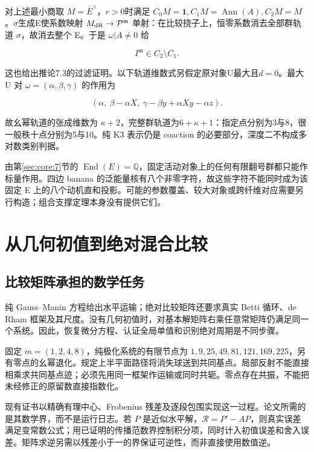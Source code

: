 \documentclass[11pt,a4paper,oneside]{ctexrep}
\theoremstyle{cnplain}
\theoremstyle{definition}
\theoremstyle{remark}
\begin{document}
对上述最小商取 \(M=\bar E^\vee\)，\(r>0\)时满足 \(C_0M=\mathbf1,C_1M=\operatorname{Ann}(A),C_2M=M\)。\(\sigma \)生成E使系数映射 \(M_{\rm dR}\to\mathcal P^{\mathfrak m}\) 单射：在比较挠子上，恒零系数消去全部群轨道 \(\sigma \)，故消去整个 E。于是 \(\omega|A\ne0\) 给

\begin{equation}
I^{\mathfrak m}\in C_2\setminus C_1. 
                                                               \label{eq:coaction:9.4}
\end{equation}

这也给出推论7.3的过滤证明。以下轨道维数式另假定原对象U最大且\(d=0\)。最大 U 对 \(\omega=(\alpha,\beta,\gamma)\) 的作用为

\begin{equation}
(\alpha,\ \beta-\alpha X,\ \gamma-\beta y+\alpha Xy-\alpha z).
\end{equation}

故幺幂轨道的张成维数为 \(\kappa +2\)，完整群轨道为\(6+\kappa +1\)：指定点分别为3与8，很一般秩十点分别为5与10。纯 K3 表示仍是 coaction 的必要部分，深度二不构成多对数类别判据。

由第\ref{sec:core:7}节的 \(\operatorname{End}(E)=\mathbb Q\)，固定活动对象上的任何有限翻号群都只能作标量作用。四边 banana 的泛能量核有八个非零字符，故这些字符不能同时成为该固定 E 上的八个动机直和投影。可能的参数覆盖、较大对象或跨纤维对应需要另行构造；组合支撑定理本身没有提供它们。


\chapter{从几何初值到绝对混合比较}\label{ch:comparison}
\section{比较矩阵承担的数学任务}
纯 Gauss--Manin 方程给出水平运输；绝对比较矩阵还要求真实 Betti 循环、de Rham 框架及其尺度。没有几何初值时，对基本解矩阵右乘任意常矩阵仍满足同一个系统。因此，恢复微分方程、认证全局单值和识别绝对周期是不同步骤。

固定 $m=(1,2,4,8)$，纯极化系统的有限节点为 $1,9,25,49,81,121,169,225$，另有零点的幺幂退化。规定上半平面路径将消失球送到共同基点。局部反射不能直接相乘求共同基点迹；必须先用同一框架作运输或同时共轭。零点存在共振，不能把未经修正的原留数直接指数化。

现有证书以精确有理中心、Frobenius 残差及逐段包围实现这一过程。论文所需的是其数学界，而不是运行日志。若 $P$ 是近似水平解，$\mathcal R=P'-AP$，则真实误差满足变常数公式；用已证明的传播范数界控制积分项，同时计入初值误差和舍入误差。矩阵求逆另需以残差小于一的界保证可逆性，而非直接使用数值逆。
\end{document}
